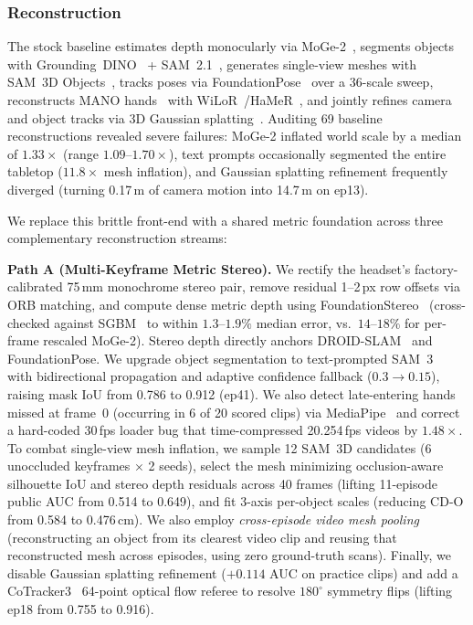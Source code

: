 \documentclass[10pt]{nvidiaextabstract}
\begin{document}
\subsubsection{Reconstruction}
\label{app:detail-recon}
The stock baseline estimates depth monocularly via MoGe-2~\cite{wang2025moge2}, segments objects with Grounding~DINO~\cite{liu2024groundingdino} + SAM~2.1~\cite{ravi2025sam2}, generates single-view meshes with SAM~3D Objects~\cite{sam3dteam2025sam3d}, tracks poses via FoundationPose~\cite{wen2024foundationpose} over a 36-scale sweep, reconstructs MANO hands~\cite{romero2017mano} with WiLoR~\cite{potamias2025wilor}/HaMeR~\cite{pavlakos2024hamer}, and jointly refines camera and object tracks via 3D Gaussian splatting~\cite{kerbl20233dgs,ye2025gsplat}. Auditing 69 baseline reconstructions revealed severe failures: MoGe-2 inflated world scale by a median of $1.33\times$ (range $1.09$--$1.70\times$), text prompts occasionally segmented the entire tabletop ($11.8\times$ mesh inflation), and Gaussian splatting refinement frequently diverged (turning 0.17\,m of camera motion into 14.7\,m on ep13).

We replace this brittle front-end with a shared metric foundation across three complementary reconstruction streams:

\textbf{Path A (Multi-Keyframe Metric Stereo).} We rectify the headset's factory-calibrated 75\,mm monochrome stereo pair, remove residual 1--2\,px row offsets via ORB matching, and compute dense metric depth using FoundationStereo~\cite{wen2025foundationstereo} (cross-checked against SGBM~\cite{hirschmuller2008sgm} to within $1.3$--$1.9\%$ median error, vs.\ $14$--$18\%$ for per-frame rescaled MoGe-2). Stereo depth directly anchors DROID-SLAM~\cite{teed2021droid} and FoundationPose. We upgrade object segmentation to text-prompted SAM~3~\cite{carion2025sam3} with bidirectional propagation and adaptive confidence fallback ($0.3 \rightarrow 0.15$), raising mask IoU from 0.786 to 0.912 (ep41). We also detect late-entering hands missed at frame~0 (occurring in 6 of 20 scored clips) via MediaPipe~\cite{zhang2020mediapipehands} and correct a hard-coded 30\,fps loader bug that time-compressed 20.254\,fps videos by $1.48\times$. To combat single-view mesh inflation, we sample 12 SAM~3D candidates (6 unoccluded keyframes $\times$ 2 seeds), select the mesh minimizing occlusion-aware silhouette IoU and stereo depth residuals across 40 frames (lifting 11-episode public AUC from 0.514 to 0.649), and fit 3-axis per-object scales (reducing CD-O from 0.584 to 0.476\,cm). We also employ \emph{cross-episode video mesh pooling} (reconstructing an object from its clearest video clip and reusing that reconstructed mesh across episodes, using zero ground-truth scans). Finally, we disable Gaussian splatting refinement ($+0.114$ AUC on practice clips) and add a CoTracker3~\cite{karaev2025cotracker3} 64-point optical flow referee to resolve $180^\circ$ symmetry flips (lifting ep18 from 0.755 to 0.916).
\end{document}
